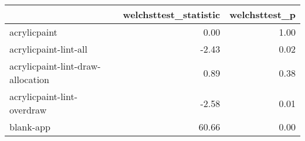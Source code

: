 \begin{tabular}{lrr}
\toprule
{} &  welchsttest\_statistic &  welchsttest\_p \\
\midrule
acrylicpaint                      &                   0.00 &           1.00 \\
acrylicpaint-lint-all             &                  -2.43 &           0.02 \\
acrylicpaint-lint-draw-allocation &                   0.89 &           0.38 \\
acrylicpaint-lint-overdraw        &                  -2.58 &           0.01 \\
blank-app                         &                  60.66 &           0.00 \\
\bottomrule
\end{tabular}
